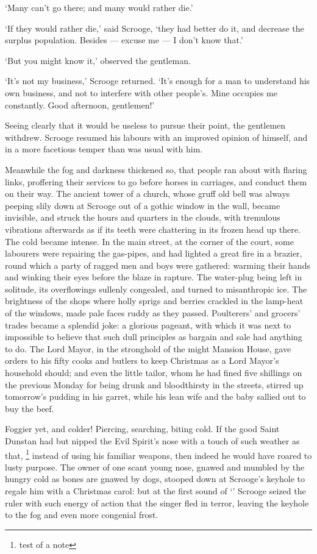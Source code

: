 \documentclass[11pt,twoside]{article}\makeatletter
\begin{document}
‘Many can't go there; and many would rather die.’\par
‘If they would rather die,’ said Scrooge, ‘they had better do it, and decrease the surplus population.  Besides — excuse me — I don't know that.’\par
‘But you might know it,’ observed the gentleman.  \par
‘It's not my business,’ Scrooge returned.  ‘It's enough for a man to understand his own business, and not to interfere with other people's.  Mine occupies me constantly. Good afternoon, gentlemen!’\par
Seeing clearly that it would be useless to pursue their point, the gentlemen withdrew.  Scrooge resumed his labours with an improved opinion of himself, and in a more facetious temper than was usual with him. \par
Meanwhile the fog and darkness thickened so, that people ran about with flaring links, proffering their services to go before horses in carriages, and conduct them on their way. The ancient tower of a church, whose gruff old bell was always peeping slily down at Scrooge out of a gothic window in the wall, became invisible, and struck the hours and quarters in the clouds, with tremulous vibrations afterwards as if its teeth were chattering in its frozen head up there. The cold became intense.  In the main street, at the corner of the court, some labourers were repairing the gas-pipes, and had lighted a great fire in a brazier, round which a party of ragged men and boys were gathered: warming their hands and winking their eyes before the blaze in rapture. The water-plug being left in solitude, its overflowings sullenly congealed, and turned to misanthropic ice.  The brightness of the shops where holly sprigs and berries crackled in the lamp-heat of the windows, made pale faces ruddy as they passed.  Poulterers' and grocers' trades became a splendid joke: a glorious pageant, with which it was next to impossible to believe that such dull principles as bargain and sale had anything to do.  The Lord Mayor, in the stronghold of the might Mansion House, gave orders to his fifty cooks and butlers to keep Christmas as a Lord Mayor's household should; and even the little tailor, whom he had fined five shillings on the previous Monday for being drunk and bloodthirsty in the streets, stirred up tomorrow's pudding in his garret, while his lean wife and the baby sallied out to buy the beef.  \par
Foggier yet, and colder!  Piercing, searching, biting cold. If the good Saint Dunstan had but nipped the Evil Spirit's nose with a touch of such weather as that, \footnote{test of a note} instead of using his familiar weapons, then indeed he would have roared to lusty purpose.  The owner of one scant young nose, gnawed and mumbled by the hungry cold as bones are gnawed by dogs, stooped down at Scrooge's keyhole to regale him with a Christmas carol: but at the first sound of  ‘’ Scrooge seized the ruler with such energy of action that the singer fled in terror, leaving the keyhole to the fog and even more congenial frost.  \par
\end{document}
